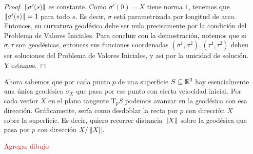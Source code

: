 \begin{prop}
\begin{proof}
$\left\| \sigma'(s) \right\|$ es constante. Como $\sigma'(0)=X$ tiene norma $1$, tenemos que $\left\| \sigma'(s) \right\|=1$ para todo $s$. Es decir, $\sigma$ está parametrizada por longitud de arco. Entonces, su curvatura geodésica debe ser nula precisamente por la condición del Problema de Valores Iniciales. Para concluir con la demostración, notemos que si $\sigma,\tau$ son geodésicas, entonces sus funciones coordenadas $(\sigma^1,\sigma^2),(\tau^1,\tau^2)$ deben ser soluciones del Problema de Valores Iniciales, y así por la unicidad de solución. Y estamos.
\end{proof}
\end{prop}

Ahora sabemos que por cada punto $p$ de una superficie $S\subseteq\mathbb{R}^3$ hay esencialmente una única geodésica $\sigma_X$ que pasa por ese punto con cierta velocidad inicial. Por cada vector $X$ en el plano tangente $\mathrm{T}_pS$ podemos avanzar en la geodésica con esa dirección. Gráficamente, sería como desdoblar la recta por $p$ con dirección $X$ sobre la superficie. Es decir, quiero recorrer distancia $\left\| X \right\|$ sobre la geodésica que pasa por $p$ con dirección $X/\left\| X \right\|$.

\textcolor{red}{Agregar dibujo} 

